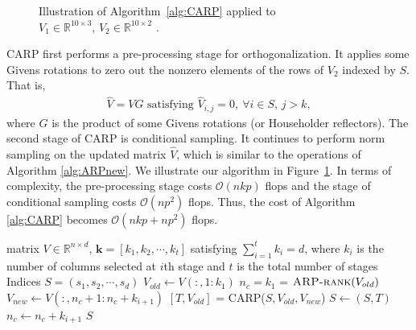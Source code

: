 \documentclass[11pt]{article}
\newcommand{\be}{\begin{eqnarray}}
\newcommand{\ee}{\end{eqnarray}}
\newcommand{\R}{\mathbb{R}}
\newcommand{\<}{\langle}
\renewcommand{\>}{\rangle}
\begin{document}
\begin{figure}[H]
\begin{center}
    \end{center}
    \caption{Illustration of Algorithm~\ref{alg:CARP} applied to $V_1 \in \R^{10\times 3},\, V_2\in \R^{10\times 2}$ .}\label{fig:procedure_carp}
\end{figure}

CARP first performs a pre-processing stage for orthogonalization. It applies some Givens rotations to zero out the nonzero elements of the rows of $V_2$ indexed by $S$. That is,
\be
\widehat{V} = V G\text{ satisfying } \widehat{V}_{i,j} = 0 ,\ \forall i\in S,\,j>k,
\ee
where $G$ is the product of some Givens rotations (or Householder reflectors). The second stage of CARP is conditional sampling. It continues to perform norm sampling on the updated matrix $\widehat{V}$, which is similar to the operations of Algorithm \ref{alg:ARPnew}. We illustrate our algorithm in Figure~\ref{fig:procedure_carp}. In terms of complexity, the pre-processing stage costs $\mathcal{O}(nkp)$ flops and the stage of conditional sampling costs $\mathcal{O}(np^2)$ flops. Thus, the cost of Algorithm \ref{alg:CARP} becomes $\mathcal{O}(nkp + np^2)$  flops.

\begin{algorithm}[H]
\caption{Multi-Stage Adaptive Randomized Pivoting (MSARP)}
\label{alg:MSARP}
\begin{algorithmic}[1]

\Require matrix $V \in \mathbb{R}^{n \times d}$, $\mathbf{k} = [k_1,k_2,\cdots,k_t]$ satisfying $\sum\limits_{i=1}^t k_i = d$, where $k_i$ is the number of columns selected at $i$th stage and $t$ is the total number of stages
\Ensure Indices $S = (s_1,s_2,\cdots,s_d)$
\State $V_{old} \gets V(:,1:k_1)$
\State $n_c = k_1$
\State [$V_{old}, S$] = $\textsc{ARP-rank}(V_{old})$
    \State $V_{new} \gets V(:,n_c+1:n_c+k_{i+1})$
    \State $[T,V_{old}]$ = \textsc{CARP}($S,V_{old},V_{new}$)
    \State $S \gets (S,T)$
    \State $n_c \gets n_c + k_{i+1}$
\EndFor
\State \Return $S$
\EndFunction
\end{algorithmic}
\end{algorithm}
\end{document}
